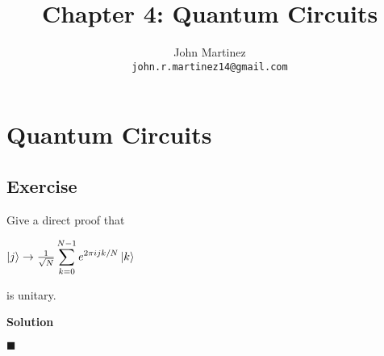 \documentclass{article}
\title{Chapter 4: Quantum Circuits}
\author{
  John Martinez \\
  \texttt{john.r.martinez14@gmail.com} \\
}
\begin{document}
\maketitle


\section{Quantum Circuits}

\subsection{Exercise}
Give a direct proof that

\begin{center}
  $\ket{j} \rightarrow
  \frac{1}{\sqrt{N}}\displaystyle\sum_{k=0}^{N-1}e^{2\pi i j k /N}\ket{k}$
\end{center}

is unitary.

\textbf{Solution}

$\blacksquare$
\end{document}
